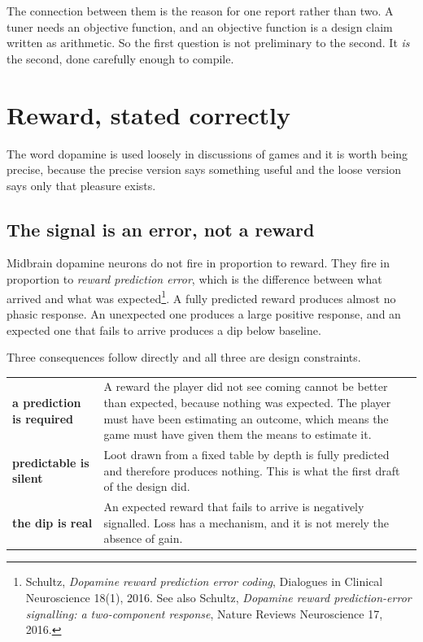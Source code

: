 \documentclass[11pt,a4paper]{article}
\begin{document}
\begin{sectionbox}
The connection between them is the reason for one report rather than two. A tuner needs an
objective function, and an objective function is a design claim written as arithmetic. So the
first question is not preliminary to the second. It \emph{is} the second, done carefully enough
to compile.
\end{sectionbox}

\section{Reward, stated correctly}
\label{sec:reward}

The word dopamine is used loosely in discussions of games and it is worth being precise, because
the precise version says something useful and the loose version says only that pleasure exists.

\subsection{The signal is an error, not a reward}

Midbrain dopamine neurons do not fire in proportion to reward. They fire in proportion to
\emph{reward prediction error}, which is the difference between what arrived and what was
expected\footnote{Schultz, \emph{Dopamine reward prediction error coding}, Dialogues in Clinical
Neuroscience 18(1), 2016. See also Schultz, \emph{Dopamine reward prediction-error signalling: a
two-component response}, Nature Reviews Neuroscience 17, 2016.}. A fully predicted reward
produces almost no phasic response. An unexpected one produces a large positive response, and an
expected one that fails to arrive produces a dip below baseline.

Three consequences follow directly and all three are design constraints.

\begin{center}
\begin{tabular}{@{}l@{\hspace{5mm}}>{\raggedright\arraybackslash}p{}@{}}
\toprule
\textbf{a prediction is required} & A reward the player did not see coming cannot be better than
expected, because nothing was expected. The player must have been estimating an outcome, which
means the game must have given them the means to estimate it. \\[1mm]
\textbf{predictable is silent}    & Loot drawn from a fixed table by depth is fully predicted and
therefore produces nothing. This is what the first draft of the design did. \\[1mm]
\textbf{the dip is real}          & An expected reward that fails to arrive is negatively
signalled. Loss has a mechanism, and it is not merely the absence of gain. \\
\bottomrule
\end{tabular}
\end{center}
\end{document}
